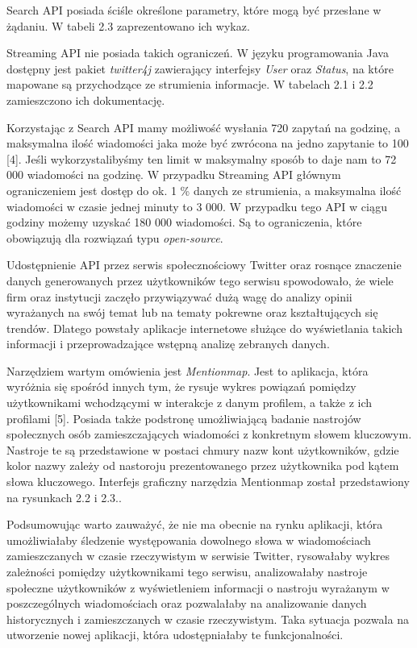 Search API posiada ściśle określone parametry, które mogą być przesłane w żądaniu. W tabeli 2.3 zaprezentowano ich wykaz.

Streaming API nie posiada takich ograniczeń. W języku programowania Java dostępny jest pakiet \textit{twitter4j} zawierający interfejsy \textit{User} oraz \textit{Status}, na które mapowane są przychodzące ze strumienia informacje. W tabelach 2.1 i 2.2 zamieszczono ich dokumentację. 

Korzystając z Search API mamy możliwość wysłania 720 zapytań na godzinę, a maksymalna ilość wiadomości jaka może być zwrócona na jedno zapytanie to 100 [4]. Jeśli wykorzystalibyśmy ten limit w maksymalny sposób to daje nam to 72 000 wiadomości na godzinę. W przypadku Streaming API głównym ograniczeniem jest dostęp do ok. 1 \% danych ze strumienia, a maksymalna ilość wiadomości w czasie jednej minuty to 3 000. W przypadku tego API w ciągu godziny możemy uzyskać 180 000 wiadomości. Są to ograniczenia, które obowiązują dla rozwiązań typu \textit{open-source}.

Udostępnienie API przez serwis społecznościowy Twitter oraz rosnące znaczenie danych generowanych przez użytkowników tego serwisu spowodowało, że wiele firm oraz instytucji zaczęło przywiązywać dużą wagę do analizy opinii wyrażanych na swój temat lub na tematy pokrewne oraz kształtujących się trendów. Dlatego powstały aplikacje internetowe służące do wyświetlania takich informacji i przeprowadzające wstępną analizę zebranych danych.

Narzędziem wartym omówienia jest \textit{Mentionmap}. Jest to aplikacja, która wyróżnia się spośród innych tym, że rysuje wykres powiązań pomiędzy użytkownikami wchodzącymi w interakcje z danym profilem, a także z ich profilami [5]. Posiada także podstronę umożliwiającą badanie nastrojów społecznych osób zamieszczających wiadomości z konkretnym słowem kluczowym. Nastroje te są przedstawione w postaci chmury nazw kont użytkowników, gdzie kolor nazwy zależy od nastoroju prezentowanego przez użytkownika pod kątem słowa kluczowego. Interfejs graficzny narzędzia Mentionmap został przedstawiony na rysunkach 2.2 i 2.3..

Podsumowując warto zauważyć, że nie ma obecnie na rynku aplikacji, która umożliwiałaby śledzenie występowania dowolnego słowa w wiadomościach zamieszczanych w czasie rzeczywistym w serwisie Twitter, rysowałaby wykres zależności pomiędzy użytkownikami tego serwisu, analizowałaby nastroje społeczne użytkowników z wyświetleniem informacji o nastroju wyrażanym w poszczególnych wiadomościach oraz pozwalałaby na analizowanie danych historycznych i zamieszczanych w czasie rzeczywistym. Taka sytuacja pozwala na utworzenie nowej aplikacji, która udostępniałaby te funkcjonalności. 

